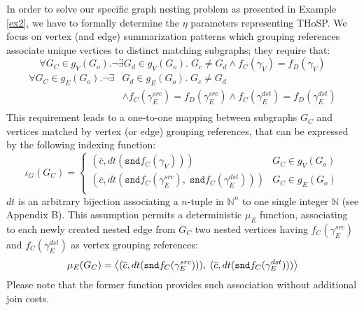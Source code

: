 In order to solve our specific graph nesting problem as presented in Example \vref{ex2}, we have to formally determine the $\eta$ parameters representing THoSP.
We focus on vertex (and edge) summarization patterns which grouping references associate unique vertices to distinct matching subgraphs; they require that:
\[\forall G_C\in g_V(G_o).\neg\exists G_d\in g_V(G_o).\; G_c\neq G_d\wedge f_C(\gamma_V)=f_D(\gamma_V)\]
\[\begin{split}
\forall G_C\in g_E(G_o).\neg\exists &G_d\in g_E(G_o).\; G_c\neq G_d\\
 &\wedge f_C(\gamma_E^{src})=f_D(\gamma_E^{src})\wedge f_C(\gamma_E^{dst})=f_D(\gamma_E^{dst})\\
\end{split}\]
This requirement leads to a one-to-one mapping between subgraphs $G_C$ and vertices matched by vertex (or edge) grouping references, that can be expressed by the following indexing function:
	\[\iota_G(G_C)=\begin{cases}
(\overline{c},dt(\texttt{snd}f_C(\gamma_V))) & G_C \in g_V(G_{o})\\
(\overline{c},dt\left(\texttt{snd}f_C(\gamma_E^{src}),\;\texttt{snd}f_C(\gamma_E^{dst})\right)) & G_C \in g_E(G_{o})\\
\end{cases}\]
$dt$ is an arbitrary bijection associating a  $n$-tuple in $\mathbb{N}^n$ to one single integer $\mathbb{N}$ (see Appendix B).
This assumption permits a deterministic $\mu_E$ function, associating to each newly created nested edge from $G_C$  two nested vertices having $f_C(\gamma_E^{src})$ and $f_C(\gamma_E^{dst})$ as vertex grouping references:
	\[\mu_E(G_C)=\Braket{(\overline{c},dt(\texttt{snd}f_C(\gamma_E^{src}))),\;(\overline{c},dt(\texttt{snd}f_C(\gamma_E^{dst})))}\]
Please note that the former function provides such association without additional join costs. 


	







